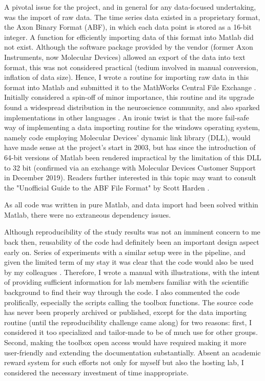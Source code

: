 A pivotal issue for the project, and in general for any data-focused undertaking, was the import of raw data. The time series data existed in a proprietary format, the Axon Binary Format (ABF), in which each data point is stored as a 16-bit integer. A function for efficiently importing data of this format into Matlab did not exist. Although the software package provided by the vendor (former Axon Instruments, now Molecular Devices) allowed an export of the data into text format, this was not considered practical (tedium involved in manual conversion, inflation of data size). Hence, I wrote a routine for importing raw data in this format into Matlab and submitted it to the MathWorks Central File Exchange \cite{hentschke_abfload_nodate}. Initially considered a spin-off of minor importance, this routine and its upgrade \cite{collman_fcollmanabfload_nodate} found a widespread distribution in the neuroscience community, and also sparked implementations in other languages \cite{caldwell_abfload_nodate, harden_swhardenpyabf_nodate}. An ironic twist is that the more fail-safe way of implementing a data importing routine for the windows operating system, namely code employing Molecular Devices' dynamic link library (DLL), would have made sense at the project's start in 2003, but has since the introduction of 64-bit versions of Matlab been rendered impractical by the limitation of this DLL to 32 bit (confirmed via an exchange with Molecular Devices Customer Support in December 2019). Readers further interested in this topic may want to consult the "Unofficial Guide to the ABF File Format" by Scott Harden \cite{harden_scott_w_unofficial_nodate}.

As all code was written in pure Matlab, and data import had been solved within Matlab, there were no extraneous dependency issues.

Although reproducibility of the study results was not an imminent concern to me back then, reusability of the code had definitely been an important design aspect early on. Series of experiments with a similar setup were in the pipeline, and given the limited term of my stay it was clear that the code would also be used by my colleagues \cite{perouansky_amnesic_2007, hentschke_altered_2009, balakrishnan_midazolam_2014}. Therefore, I wrote a manual with illustrations, with the intent of providing sufficient information for lab members familiar with the scientific background to find their way through the code. I also commented the code prolifically, especially the scripts calling the toolbox functions. The source code has never been properly archived or published, except for the data importing routine (until the reproducibility challenge came along) for two reasons: first, I considered it too specialized and tailor-made to be of much use for other groups. Second, making the toolbox open access would have required making it more user-friendly and extending the documentation substantially. Absent an academic reward system for such efforts not only for myself but also the hosting lab, I considered the necessary investment of time inappropriate.

